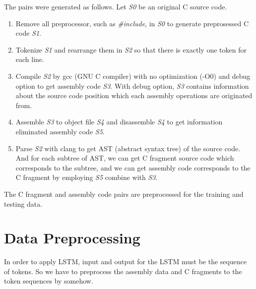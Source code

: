 \documentclass[senior,final,11pt]{iscs-thesis}
\begin{document}
The pairs were generated as follows. Let {\sl S0} be an original C source code.
\begin{enumerate}
\item Remove all preprocessor, such as {\sl \#include}, in {\sl S0} to generate preprosessed C code {\sl S1}. 
\item Tokenize {\sl S1} and rearrange them in {\sl S2} so that there is exactly one token for each line. 
\item 
Compile {\sl S2} by gcc (GNU C compiler) with no optimization (-O0) and debug option to get assembly code {\sl S3}. 
With debug option, {\sl S3} contains information about the source code position which each assembly operations are originated from.
\item Assemble {\sl S3} to object file {\sl S4} and disassemble {\sl S4} to get information eliminated assembly code {\sl S5}.
\item 
Parse {\sl S2} with clang to get AST (abstract syntax tree) of the source code. 
And for each subtree of AST, we can get C fragment source code which corresponds to the subtree, 
and we can get assembly code corresponds to the C fragment by employing {\sl S5} combine with {\sl S3}.
\end{enumerate}

The C fragment and assembly code pairs are preprocessed for the training and testing data.


\section{Data Preprocessing}

In order to apply LSTM, input and output for the LSTM must be the sequence of tokens. 
So we have to preprocess the assembly data and C fragments to the token sequences by somehow.
\end{document}
